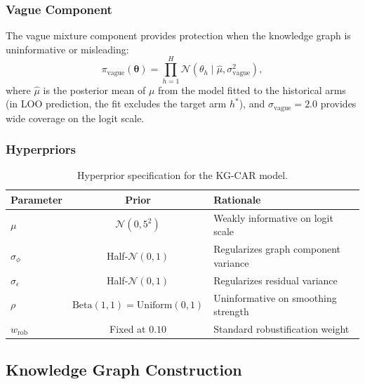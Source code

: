 \documentclass[12pt]{article}
\newcommand{\btheta}{\boldsymbol{\theta}}
\begin{document}
\subsubsection{Vague Component}

The vague mixture component provides protection when the knowledge graph is uninformative or misleading:
\begin{equation}
\label{eq:vague}
\pi_{\text{vague}}(\btheta) = \prod_{h=1}^{H} \mathcal{N}(\theta_h \mid \hat{\mu}, \sigma_{\text{vague}}^2),
\end{equation}
where $\hat{\mu}$ is the posterior mean of $\mu$ from the model fitted to the historical arms (in LOO prediction, the fit excludes the target arm $h^*$), and $\sigma_{\text{vague}} = 2.0$ provides wide coverage on the logit scale.

\subsubsection{Hyperpriors}

\begin{table}[ht]
\centering
\caption{Hyperprior specification for the KG-CAR model.}
\label{tab:hyperpriors}
\begin{tabular}{lcl}
\toprule
Parameter & Prior & Rationale \\
\midrule
$\mu$ & $\mathcal{N}(0, 5^2)$ & Weakly informative on logit scale \\
$\sigma_\phi$ & Half-$\mathcal{N}(0, 1)$ & Regularizes graph component variance \\
$\sigma_\epsilon$ & Half-$\mathcal{N}(0, 1)$ & Regularizes residual variance \\
$\rho$ & $\text{Beta}(1, 1) = \text{Uniform}(0,1)$ & Uninformative on smoothing strength \\
$w_{\text{rob}}$ & Fixed at $0.10$ & Standard robustification weight \\
\bottomrule
\end{tabular}
\end{table}

\subsection{Knowledge Graph Construction}
\label{sec:kg_construction}
\end{document}
